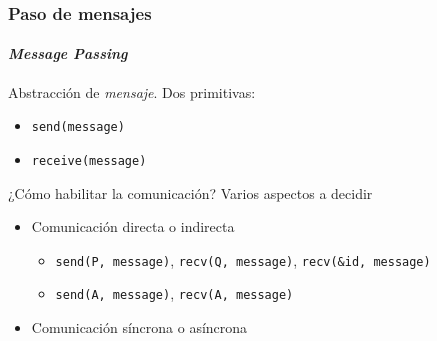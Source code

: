 \documentclass[letter]{beamer}
\begin{document}
%
%
%  
%    
%    
%
%
\begin{frame}
  \frametitle{Paso de mensajes}
  \framesubtitle{{\em Message Passing}}

  Abstracción de {\em mensaje}. Dos primitivas:
  \begin{itemize}
    \item {\tt send(message)}
    \item {\tt receive(message)}
  \end{itemize}
  ¿Cómo habilitar la comunicación? Varios aspectos a decidir
  \begin{itemize}
    \item Comunicación directa o indirecta
      \begin{itemize}
        \item {\tt send(P, message)}, {\tt recv(Q, message)}, {\tt recv(\&id, message)}
        \item {\tt send(A, message)}, {\tt recv(A, message)}
      \end{itemize}
    \item Comunicación síncrona o asíncrona
  \end{itemize}

\end{frame}
%  
\end{document}
